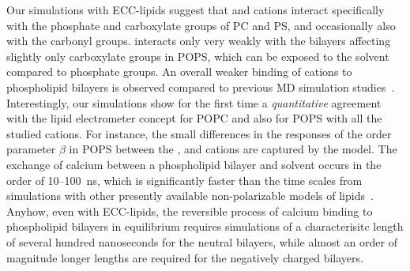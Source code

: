 Our simulations with ECC-lipids suggest that
 and  cations
interact specifically with the phosphate and carboxylate groups of PC and PS, 
and occasionally also with the carbonyl groups. 
 interacts only very weakly with the bilayers
affecting slightly only carboxylate groups in POPS,
which can be exposed to the solvent compared to phosphate groups. 
An overall weaker binding of cations to phospholipid bilayers is observed 
compared to previous MD simulation studies~\citep{nmrlipids_proj4, catte16, bockmann03, bockmann04, melcrova16, javanainen17}. 
Interestingly,
our simulations show for the first time a \emph{quantitative} agreement with the lipid electrometer concept
for POPC and also for POPS with all the studied cations. 
For instance, the small differences 
in the responses of the order parameter $\beta$ in POPS
between the 
,  and  cations
are captured by the model. 
The exchange of calcium between a phospholipid bilayer and solvent 
occurs in the order of 10--100~ns, 
which is significantly faster than the time scales from simulations 
with other presently available non-polarizable models of lipids~\citep{melcrova16, javanainen17, catte16}. 
Anyhow, even with ECC-lipids,
the reversible process of calcium binding to phospholipid bilayers in equilibrium
requires simulations of a characterisitc length of several hundred nanoseconds 
for the neutral bilayers,
while almost an order of magnitude longer lengths 
are required for the negatively charged bilayers. 


